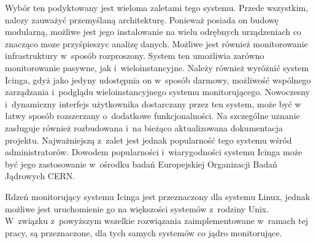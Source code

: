 Wybór ten podyktowany jest wieloma zaletami tego systemu. Przede
wszystkim, nalezy zauważyć przemyślaną architekturę. Ponieważ posiada
on budowę modularną, możliwe jest jego instalowanie na wielu odrębnych
urządzeniach co znacząco moze przyśpieszyc analizę danych. Możliwe
jest również monitorowanie infrastruktury w~sposób rozproszony. System
ten umożliwia zarówno monitorowanie pasywne, jak
i~wieloinstancyjne. Należy również wyróżnić system Icinga, gdyż jako
jedyny udostępnia on w~sposób darmowy, możliwość wspólnego zarządzania
i~podglądu wieloinstancyjnego systemu monitorującego. Nowoczesny
i~dynamiczny interfejs użytkownika dostarczany przez ten system, może
być w łatwy sposób rozszerzany o~dodatkowe funkcjonalności. Na
szczególne uznanie zasługuje również rozbudowana i~na bieżąco
aktualizowana dokumentacja projektu. Najważniejszą z~zalet jest jednak
popularność tego systemu wśród administratorów. Dowodem popularności
i~wiarygodności systemu Icinga może być jego zastosowanie w~ośrodku
badań Europejskiej Organizacji Badań Jądrowych CERN.

Rdzeń monitorujący systemu Icinga jest przeznaczony dla systemu Linux,
jednak możliwe jest uruchomienie go na większości systemów z~rodziny
Unix. W~związku z~powyższym wszelkie rozwiązania zaimplementowane
w~ramach tej pracy, są przeznaczone, dla tych samych systemów co
jądro monitorujące.
